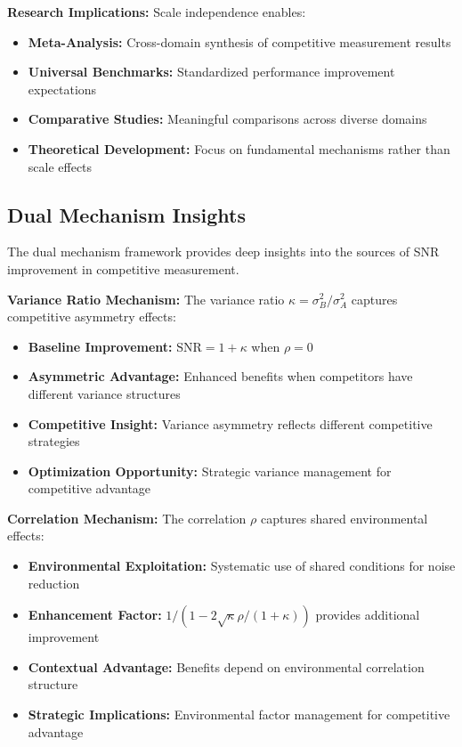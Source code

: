 \textbf{Research Implications:}
Scale independence enables:
\begin{itemize}
    \item \textbf{Meta-Analysis:} Cross-domain synthesis of competitive measurement results
    \item \textbf{Universal Benchmarks:} Standardized performance improvement expectations
    \item \textbf{Comparative Studies:} Meaningful comparisons across diverse domains
    \item \textbf{Theoretical Development:} Focus on fundamental mechanisms rather than scale effects
\end{itemize}

\subsection{Dual Mechanism Insights}

The dual mechanism framework provides deep insights into the sources of SNR improvement in competitive measurement.

\textbf{Variance Ratio Mechanism:}
The variance ratio $\kappa = \sigma_B^2/\sigma_A^2$ captures competitive asymmetry effects:
\begin{itemize}
    \item \textbf{Baseline Improvement:} $\text{SNR} = 1 + \kappa$ when $\rho = 0$
    \item \textbf{Asymmetric Advantage:} Enhanced benefits when competitors have different variance structures
    \item \textbf{Competitive Insight:} Variance asymmetry reflects different competitive strategies
    \item \textbf{Optimization Opportunity:} Strategic variance management for competitive advantage
\end{itemize}

\textbf{Correlation Mechanism:}
The correlation $\rho$ captures shared environmental effects:
\begin{itemize}
    \item \textbf{Environmental Exploitation:} Systematic use of shared conditions for noise reduction
    \item \textbf{Enhancement Factor:} $1/(1 - 2\sqrt{\kappa}\rho/(1+\kappa))$ provides additional improvement
    \item \textbf{Contextual Advantage:} Benefits depend on environmental correlation structure
    \item \textbf{Strategic Implications:} Environmental factor management for competitive advantage
\end{itemize}

